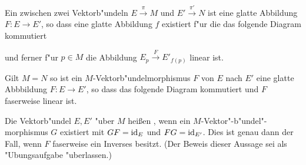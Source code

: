 Ein  zwischen zwei Vektorb"undeln $E \xrightarrow{\pi} M$ und $E' \xrightarrow{\pi'} N$ ist eine glatte Abbildung $F \colon E \to E'$, so dass eine glatte Abbildung $f$ existiert f"ur die das folgende Diagram kommutiert

\begin{center}\end{center}

und ferner f"ur $p \in M$ die Abbildung $E_p \xrightarrow{F} E'_{f(p)}$ linear ist.

Gilt $M = N$ so ist ein $M$-Vektorb"undelmorphismus $F$ von $E$ nach $E'$ eine glatte Abbbildung $F \colon E \to E'$, so dass das folgende Diagram kommutiert und $F$ faserweise linear ist.

\begin{center}\end{center}

Die Vektorb"undel $E,E'$ "uber $M$ heißen , wenn ein $M$-Vektor"-b"undel"-morphismus
$G$ existiert mit $G F = \operatorname{id}_E$ und $FG = \operatorname{id}_{E'}$.
Dies ist genau dann der Fall, wenn $F$ faserweise ein Inverses besitzt.
(Der Beweis dieser Aussage sei als "Ubungsaufgabe "uberlassen.)

